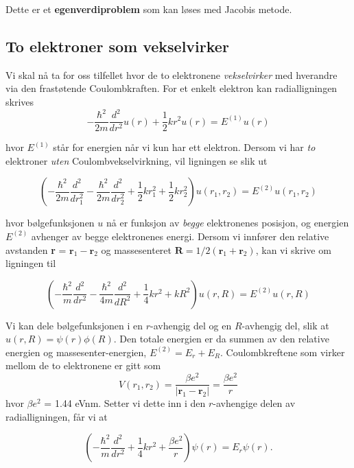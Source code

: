 \documentclass{article}
\begin{document}
Dette er et \textbf{egenverdiproblem} som kan løses med Jacobis metode. 

\subsection{To elektroner som vekselvirker}
Vi skal nå ta for oss tilfellet hvor de to elektronene \textit{vekselvirker} med hverandre via den frastøtende Coulombkraften. For et enkelt elektron kan radialligningen skrives
\begin{equation}
-\frac{\hbar ^2}{2m}\frac{d^2}{dr^2}u(r) + \frac{1}{2}kr^2u(r) = E^{(1)}u(r)
\end{equation}

hvor $E^{(1)}$ står for energien når vi kun har ett elektron. Dersom vi har \textit{to} elektroner \textit{uten} Coulombvekselvirkning, vil ligningen se slik ut

\begin{equation}
\left(  -\frac{\hbar^2}{2 m} \frac{d^2}{dr_1^2} -\frac{\hbar^2}{2 m} \frac{d^2}{dr_2^2}+ \frac{1}{2}k r_1^2+ \frac{1}{2}k r_2^2\right)u(r_1,r_2)  = E^{(2)} u(r_1,r_2)
\end{equation}

hvor bølgefunksjonen $u$ nå er funksjon av \textit{begge} elektronenes posisjon, og energien $E^{(2)}$ avhenger av begge elektronenes energi. Dersom vi innfører den relative avstanden \textbf{r} = $\textbf{r}_1 - \textbf{r}_2$ og massesenteret $\textbf{R} = 1/2(\textbf{r}_1 + \textbf{r}_2)$, kan vi skrive om ligningen til

\begin{equation}
\left(  -\frac{\hbar^2}{m} \frac{d^2}{dr^2} -\frac{\hbar^2}{4 m} \frac{d^2}{dR^2}+ \frac{1}{4} k r^2+  kR^2\right)u(r,R)  = E^{(2)} u(r,R)
\end{equation}

Vi kan dele bølgefunksjonen i en $r$-avhengig del og en $R$-avhengig del, slik at $u(r,R) = \psi (r) \phi (R) $. Den totale energien er da summen av den relative energien og massesenter-energien, $E^{(2)} = E_r + E_R$. Coulombkreftene som virker mellom de to elektronene er gitt som
\begin{equation}
V(r_1, r_2) = \frac{\beta e^2}{|\textbf{r}_1 - \textbf{r}_2|} = \frac{\beta e^2}{r}
\end{equation}
hvor $\beta e^2$ = 1.44 eVnm. Setter vi dette inn i den $r$-avhengige delen av radialligningen, får vi at

\begin{equation*}
\left(  -\frac{\hbar^2}{m} \frac{d^2}{dr^2}+ \frac{1}{4}k r^2+\frac{\beta e^2}{r}\right)\psi(r)  = E_r \psi(r).
\end{equation*}
\end{document}
